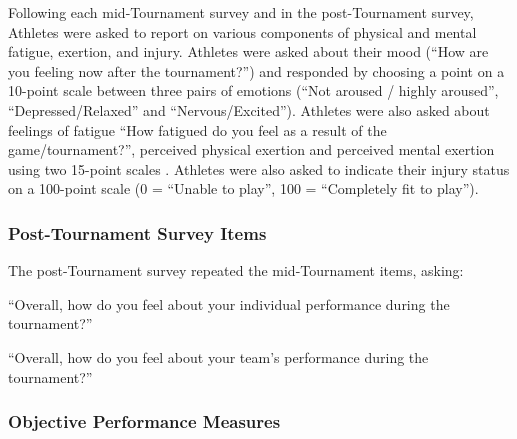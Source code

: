 \begin{CJK}{UTF8}{gbsn}
Following each mid-Tournament survey and in the post-Tournament survey, Athletes were asked to report on various components of physical and mental fatigue, exertion, and injury. Athletes were asked about their mood (``How are you feeling now after the tournament?'') and responded by choosing a point on a 10-point scale between three pairs of emotions (``Not aroused / highly aroused'',  ``Depressed/Relaxed'' and  ``Nervous/Excited'').  Athletes were also asked about feelings of fatigue ``How fatigued do you feel as a result of the game/tournament?'', perceived physical exertion \citep[Borg RPE scale;][]{Borg1990} and perceived mental exertion using two 15-point scales \citep[see][]{Noakes2012a}.  Athletes were also asked to indicate their injury status on a 100-point scale (0 = ``Unable to play'', 100 = ``Completely fit to play'').




\subsubsection{Post-Tournament Survey Items\label{app8:surveyPost}}
The post-Tournament survey repeated the mid-Tournament items, asking:
\begin{description}[labelindent=1cm]
\item [Individual Performance Expectations] ``Overall, how do you feel about your individual performance during the tournament?''
\item [Team Performance Expectations]``Overall, how do you feel about your team's performance during the tournament?''
\end{description}

\subsubsection{Objective Performance Measures\label{app8:objectivePerformance}}


\end{CJK}
